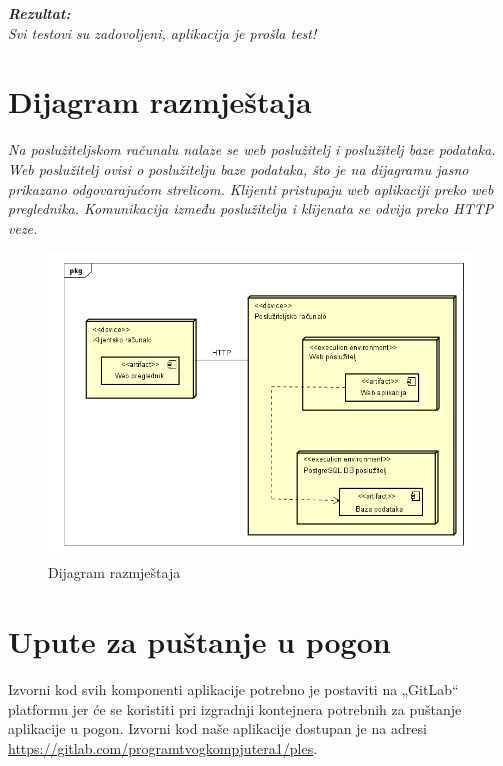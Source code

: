 			  \textbf{\textit{Rezultat:}}\\
			  \textit{Svi testovi su zadovoljeni, aplikacija je prošla test!}\\
			 
			
			\eject 
		
		
		\section{Dijagram razmještaja}
			
			
			 \textit{Na poslužiteljskom računalu nalaze se web poslužitelj i poslužitelj baze podataka. Web poslužitelj ovisi o poslužitelju baze podataka, što je na dijagramu jasno prikazano odgovarajućom strelicom. Klijenti pristupaju web aplikaciji preko web preglednika. Komunikacija između poslužitelja i klijenata se odvija preko HTTP veze.}
			
			 \begin{figure}[H]
				\includegraphics[scale=0.7]{slike/Dijagram_Razmjestaja.png} %
				\centering
				\caption{Dijagram razmještaja}
				\label{fig:razmjestaj}
			\end{figure}


			\eject 
		
		\section{Upute za puštanje u pogon}

 Izvorni kod svih komponenti aplikacije potrebno je postaviti na „GitLab“ platformu jer će se koristiti pri izgradnji kontejnera potrebnih za puštanje aplikacije u pogon. Izvorni kod naše aplikacije dostupan je na adresi \url{https://gitlab.com/programtvogkompjutera1/ples}. 


